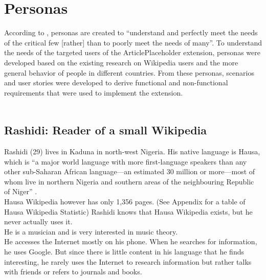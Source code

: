 \chapter{Personas}

According to \citet[182]{design:01}, personas are created to ``understand and perfectly meet the needs of the critical few [rather] than to poorly meet the needs of many''. To understand the needs of the targeted users of the ArticlePlaceholder extension, personas were developed based on the existing research on Wikipedia users \citep{wiki:37} and the more general behavior of people in different countries. From these personas, scenarios and user stories were developed to derive functional and non-functional requirements that were used to implement the extension. \\
\\
\section{Rashidi: Reader of a small Wikipedia}
Rashidi (29) lives in Kaduna in north-west Nigeria. His native language is Hausa, which is ``a major world language with more first-language speakers than any other sub-Saharan African language---an estimated 30 million or more---most of whom live in northern Nigeria and southern areas of the neighbouring Republic of Niger'' \cite[p1]{hausa}. \\
Hausa Wikipedia however has only 1,356 pages. (See Appendix for a table of Hausa Wikipedia Statistic) Rashidi knows that Hausa Wikipedia exists, but he never actually uses it. \\
He is a musician and is very interested in music theory. \\
He accesses the Internet mostly on his phone. When he searches for information, he uses Google. But since there is little content in his language that he finds interesting, he rarely uses the Internet to research information but rather talks with friends or refers to journals and books.


